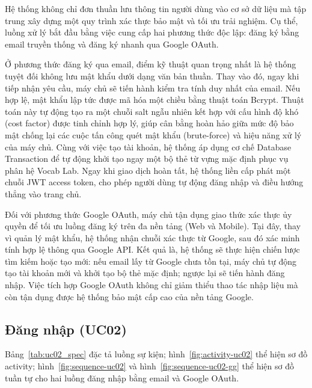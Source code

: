 Hệ thống không chỉ đơn thuần lưu thông tin người dùng vào cơ sở dữ liệu mà tập trung xây dựng một quy trình xác thực bảo mật và tối ưu trải nghiệm. Cụ thể, luồng xử lý bắt đầu bằng việc cung cấp hai phương thức độc lập: đăng ký bằng email truyền thống và đăng ký nhanh qua Google OAuth.

Ở phương thức đăng ký qua email, điểm kỹ thuật quan trọng nhất là hệ thống tuyệt đối không lưu mật khẩu dưới dạng văn bản thuần. Thay vào đó, ngay khi tiếp nhận yêu cầu, máy chủ sẽ tiến hành kiểm tra tính duy nhất của email. Nếu hợp lệ, mật khẩu lập tức được mã hóa một chiều bằng thuật toán Bcrypt. Thuật toán này tự động tạo ra một chuỗi salt ngẫu nhiên kết hợp với cấu hình độ khó (cost factor) được tinh chỉnh hợp lý, giúp cân bằng hoàn hảo giữa mức độ bảo mật chống lại các cuộc tấn công quét mật khẩu (brute-force) và hiệu năng xử lý của máy chủ. Cùng với việc tạo tài khoản, hệ thống áp dụng cơ chế Database Transaction để tự động khởi tạo ngay một bộ thẻ từ vựng mặc định phục vụ phân hệ Vocab Lab. Ngay khi giao dịch hoàn tất, hệ thống liền cấp phát một chuỗi JWT access token, cho phép người dùng tự động đăng nhập và điều hướng thẳng vào trang chủ.

\begin{sloppypar}
Đối với phương thức Google OAuth, máy chủ tận dụng giao thức xác thực ủy quyền để tối ưu luồng đăng ký trên đa nền tảng (Web và Mobile). Tại đây, thay vì quản lý mật khẩu, hệ thống nhận chuỗi xác thực từ Google, sau đó xác minh tính hợp lệ thông qua Google API. Kết quả là, hệ thống sẽ thực hiện chiến lược tìm kiếm hoặc tạo mới: nếu email lấy từ Google chưa tồn tại, máy chủ tự động tạo tài khoản mới và khởi tạo bộ thẻ mặc định; ngược lại sẽ tiến hành đăng nhập. Việc tích hợp Google OAuth không chỉ giảm thiểu thao tác nhập liệu mà còn tận dụng được hệ thống bảo mật cấp cao của nền tảng Google.
\end{sloppypar}

\subsection{Đăng nhập (UC02)}
Bảng~\ref{tab:uc02_spec} đặc tả luồng sự kiện; hình~\ref{fig:activity-uc02} thể hiện sơ đồ activity; hình~\ref{fig:sequence-uc02} và hình~\ref{fig:sequence-uc02-gg} thể hiện sơ đồ tuần tự cho hai luồng đăng nhập bằng email và Google OAuth.

